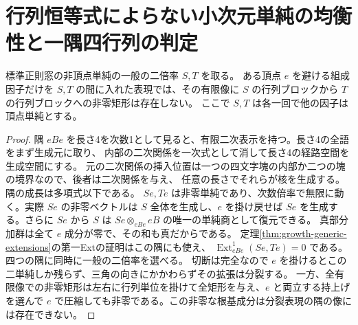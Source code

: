 \section{行列恒等式によらない小次元単純の均衡性と一隅四行列の判定}
\label{sec:generic-corner-small-simples}
\begin{lemma}\label{lem:generic-corner-separation}
標準正則窓の非頂点単純の一般の二倍率 $S,T$ を取る。
ある頂点 $e$ を避ける組成因子だけを $S,T$ の間に入れた表現では、その有限像に
$S$ の行列ブロックから $T$ の行列ブロックへの非零矩形は存在しない。
ここで $S,T$ は各一回で他の因子は頂点単純とする。
\end{lemma}
\begin{proof}
隅 $eBe$ を長さ4を次数1として見ると、有限二次表示を持つ。長さ4の全語をまず生成元に取り、
内部の二次関係を一次式として消して長さ4の経路空間を生成空間にする。
元の二次関係の挿入位置は一つの四文字塊の内部か二つの塊の境界なので、後者は二次関係を与え、
任意の長さでそれらが核を生成する。隅の成長は多項式以下である。
$Se,Te$ は非零単純であり、次数倍率で無限に動く。実際 $Se$ の非零ベクトルは
$S$ 全体を生成し、$e$ を掛け戻せば $Se$ を生成する。さらに $Se$ から $S$ は
$Se\otimes_{eBe}eB$ の唯一の単純商として復元できる。
真部分加群は全て $e$ 成分が零で、その和も真だからである。
定理\ref{thm:growth-generic-extensions}の第一Extの証明はこの隅にも使え、
$\operatorname{Ext}^1_{eBe}(Se,Te)=0$ である。四つの隅に同時に一般の二倍率を選べる。
切断は完全なので $e$ を掛けるとこの二単純しか残らず、三角の向きにかかわらずその拡張は分裂する。
一方、全有限像での非零矩形は左右に行列単位を掛けて全矩形を与え、$e$ と両立する持上げを選んで
$e$ で圧縮しても非零である。この非零な根基成分は分裂表現の隅の像には存在できない。
\end{proof}

